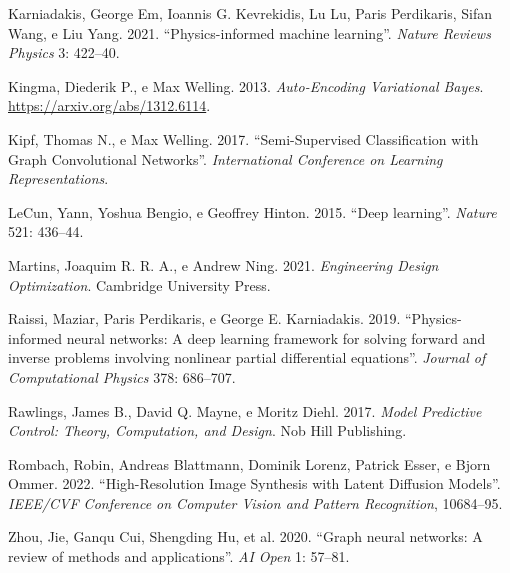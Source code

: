 \documentclass[
  brazilian,
  a4paper,
  DIV=11,
  numbers=noendperiod]{scrreprt}
\newlength{\cslhangindent}
\newenvironment{CSLReferences}[2] %
 {\begin{list}{}{%
  \setlength{\itemindent}{0pt}
  \setlength{\leftmargin}{0pt}
  \setlength{\parsep}{0pt}
  \ifodd #1
   \setlength{\leftmargin}{\cslhangindent}
   \setlength{\itemindent}{-1\cslhangindent}
  \fi
  \setlength{\itemsep}{#2\baselineskip}}}
 {\end{list}}
\begin{document}
\begin{CSLReferences}{1}{1}
Karniadakis, George Em, Ioannis G. Kevrekidis, Lu Lu, Paris Perdikaris,
Sifan Wang, e Liu Yang. 2021. {``Physics-informed machine learning''}.
\emph{Nature Reviews Physics} 3: 422--40.

Kingma, Diederik P., e Max Welling. 2013. \emph{Auto-Encoding
Variational Bayes}. \url{https://arxiv.org/abs/1312.6114}.

Kipf, Thomas N., e Max Welling. 2017. {``Semi-Supervised Classification
with Graph Convolutional Networks''}. \emph{International Conference on
Learning Representations}.

LeCun, Yann, Yoshua Bengio, e Geoffrey Hinton. 2015. {``Deep
learning''}. \emph{Nature} 521: 436--44.

Martins, Joaquim R. R. A., e Andrew Ning. 2021. \emph{Engineering Design
Optimization}. Cambridge University Press.

Raissi, Maziar, Paris Perdikaris, e George E. Karniadakis. 2019.
{``Physics-informed neural networks: A deep learning framework for
solving forward and inverse problems involving nonlinear partial
differential equations''}. \emph{Journal of Computational Physics} 378:
686--707.

Rawlings, James B., David Q. Mayne, e Moritz Diehl. 2017. \emph{Model
Predictive Control: Theory, Computation, and Design}. Nob Hill
Publishing.

Rombach, Robin, Andreas Blattmann, Dominik Lorenz, Patrick Esser, e
Bjorn Ommer. 2022. {``High-Resolution Image Synthesis with Latent
Diffusion Models''}. \emph{IEEE/CVF Conference on Computer Vision and
Pattern Recognition}, 10684--95.

Zhou, Jie, Ganqu Cui, Shengding Hu, et al. 2020. {``Graph neural
networks: A review of methods and applications''}. \emph{AI Open} 1:
57--81.

\end{CSLReferences}
\end{document}
